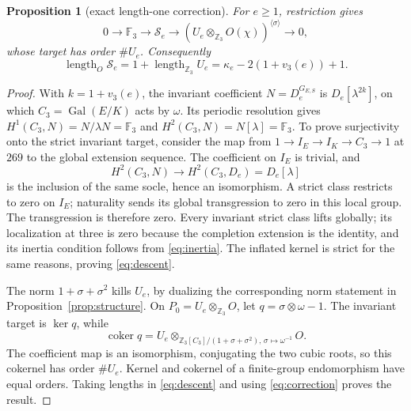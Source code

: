 \documentclass[11pt]{article}
\newtheorem{proposition}[theorem]{Proposition}
\theoremstyle{remark}\newtheorem{remark}[theorem]{Remark}
\newcommand{\Z}{\mathbb Z}\newcommand{\Q}{\mathbb Q}\newcommand{\F}{\mathbb F}
\newcommand{\Gal}{\operatorname{Gal}}\newcommand{\len}{\operatorname{length}}
\newcommand{\coker}{\operatorname{coker}}\newcommand{\lc}{\widetilde{\Cl}_3}
\begin{document}
\begin{proposition}[exact length-one correction]
\label{prop:descent}
For $e\geq1$, restriction gives
\begin{equation}
0\longrightarrow\F_3\longrightarrow\mathcal S_e\longrightarrow
 (U_e\otimes_{\Z_3}O(\chi))^{\langle\sigma\rangle}\longrightarrow0,
\label{eq:descent}
\end{equation}
whose target has order $\#U_e$.
Consequently
\begin{equation}
\len_O\mathcal S_e=1+\len_{\Z_3}U_e
 =\kappa_e-2(1+v_3(e))+1.\label{eq:exactlength}
\end{equation}
\end{proposition}
\begin{proof}
With $k=1+v_3(e)$, the invariant coefficient $N=D_e^{G_{E,S}}$ is $D_e[\lambda^{2k}]$, on which $C_3=\Gal(E/K)$ acts by $\omega$.
Its periodic resolution gives $H^1(C_3,N)=N/\lambda N=\F_3$ and $H^2(C_3,N)=N[\lambda]=\F_3$.
To prove surjectivity onto the strict invariant target, consider the map from
$1\to I_E\to I_K\to C_3\to1$ at $269$ to the global extension sequence.
The coefficient on $I_E$ is trivial, and
\[
 H^2(C_3,N)\longrightarrow H^2(C_3,D_e)=D_e[\lambda]
\]
is the inclusion of the same socle, hence an isomorphism.
A strict class restricts to zero on $I_E$; naturality sends its global transgression to zero in this local group.
The transgression is therefore zero.
Every invariant strict class lifts globally; its localization at three is zero because the completion extension is the identity, and its inertia condition follows from \eqref{eq:inertia}.
The inflated kernel is strict for the same reasons, proving \eqref{eq:descent}.

The norm $1+\sigma+\sigma^2$ kills $U_e$, by dualizing the corresponding norm statement in Proposition~\ref{prop:structure}.
On $P_0=U_e\otimes_{\Z_3}O$, let $q=\sigma\otimes\omega-1$.
The invariant target is $\ker q$, while
\[
\coker q=U_e\otimes_{\Z_3[C_3]/(1+\sigma+\sigma^2),\,\sigma\mapsto\omega^{-1}}O.
\]
The coefficient map is an isomorphism, conjugating the two cubic roots, so this cokernel has order $\#U_e$.
Kernel and cokernel of a finite-group endomorphism have equal orders.
Taking lengths in \eqref{eq:descent} and using \eqref{eq:correction} proves the result.
\end{proof}
\end{document}
